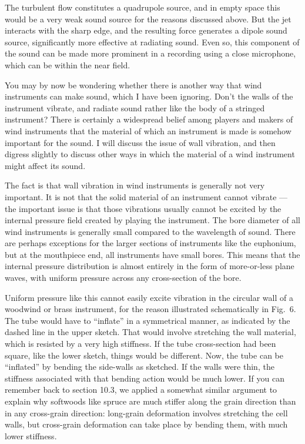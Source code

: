   The turbulent flow constitutes a quadrupole source, and in empty space this 
  would be a very weak sound source for the reasons discussed above. But the 
  jet interacts with the sharp edge, and the resulting force generates a dipole 
  sound source, significantly more effective at radiating sound. Even so, this 
  component of the sound can be made more prominent in a recording using a 
  close microphone, which can be within the near field. 

  You may by now be wondering whether there is another way that wind 
  instruments can make sound, which I have been ignoring. Don’t the walls of 
  the instrument vibrate, and radiate sound rather like the body of a stringed 
  instrument? There is certainly a widespread belief among players and makers 
  of wind instruments that the material of which an instrument is made is 
  somehow important for the sound. I will discuss the issue of wall vibration, 
  and then digress slightly to discuss other ways in which the material of a 
  wind instrument might affect its sound. 

  The fact is that wall vibration in wind instruments is generally not very 
  important. It is not that the solid material of an instrument cannot vibrate 
  — the important issue is that those vibrations usually cannot be excited by 
  the internal pressure field created by playing the instrument. The bore 
  diameter of all wind instruments is generally small compared to the 
  wavelength of sound. There are perhaps exceptions for the larger sections of 
  instruments like the euphonium, but at the mouthpiece end, all instruments 
  have small bores. This means that the internal pressure distribution is 
  almost entirely in the form of more-or-less plane waves, with uniform 
  pressure across any cross-section of the bore. 

  Uniform pressure like this cannot easily excite vibration in the circular 
  wall of a woodwind or brass instrument, for the reason illustrated 
  schematically in Fig.\ 6. The tube would have to “inflate” in a symmetrical 
  manner, as indicated by the dashed line in the upper sketch. That would 
  involve stretching the wall material, which is resisted by a very high 
  stiffness. If the tube cross-section had been square, like the lower sketch, 
  things would be different. Now, the tube can be “inflated” by bending the 
  side-walls as sketched. If the walls were thin, the stiffness associated with 
  that bending action would be much lower. If you can remember back to section 
  10.3, we applied a somewhat similar argument to explain why softwoods like 
  spruce are much stiffer along the grain direction than in any cross-grain 
  direction: long-grain deformation involves stretching the cell walls, but 
  cross-grain deformation can take place by bending them, with much lower 
  stiffness. 

